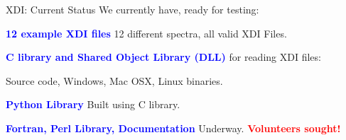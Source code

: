 \documentclass[final]{beamer}
\newcommand{\Color}[2]{{\textcolor{#1}{#2}}}
\newcommand{\BoldRed}[1]{{\Color{Red}{\bf{#1}}}}
\newcommand{\Blue}[1]{{\Color{Blue}{\bf{#1}}}}
\begin{document}
\begin{frame}{}
\begin{columns}[t]
\begin{column}{.54\linewidth}
\begin{block}{\large XDI: Current Status}
          We currently have, ready for testing:
          \begin{center}
            \begin{minipage}{0.9\linewidth}
              \begin{description}[A]
              \item {\Blue{12 example XDI files}} 12 different spectra, all valid  XDI Files.
              \item {\Blue{C library and Shared Object Library (DLL)}}  for
                reading XDI files:\par   {\hspace{10mm}} Source code, Windows, Mac OSX, Linux binaries.
              \item {\Blue{Python Library}}  Built using C library.
              \item {\Blue{Fortran, Perl Library, Documentation}}  Underway.
                {\BoldRed{Volunteers sought!}}
              \end{description}
            \end{minipage}
          \end{center}

        \end{block}
      \end{column}

      \begin{column}{.01\linewidth}
      \end{column}


\end{columns}
\end{frame}
\end{document}
